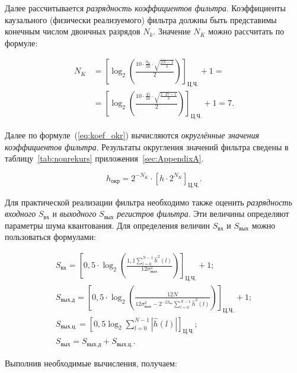 \point Далее рассчитывается \textit{разрядность коэффициентов
  фильтра}. Коэффициенты каузального (физически реализуемого) фильтра
должны быть представимы конечным числом двоичных разрядов $N_k$.
Значение $N_K$ можно рассчитать по формуле:

\begin{align}
  \nonumber N_K & = \left[\log_2\left(\displaystyle
      \frac{\displaystyle 10 \cdot \frac{a_0}{20} \cdot
        \sqrt{\frac{2N-1}{3}}}{2}\right) \right]_{\text{Ц.Ч.}} + 1 =\\
  \nonumber & = \left[\log_2\left(\displaystyle \frac{\displaystyle 10
        \cdot \frac{45}{20} \cdot \sqrt{\frac{2 \cdot
            27-1}{3}}}{2}\right) \right]_{\text{Ц.Ч.}} + 1 = 7.
\end{align}


\point Далее по формуле~(\ref{eq:koef_okr}) вычисляются
\textit{округлённые значения коэффициентов фильтра}. Результаты
округления значений фильтра сведены в таблицу~\ref{tab:nonrekurs}
приложения~\ref{sec:AppendixA}.

\begin{equation}
  \label{eq:koef_okr}
  h_{\text{окр}} = 2^{-N_K} \cdot \left[h \cdot 2^{N_K}\right]_{\text{Ц.Ч.}}.
\end{equation}


\point Для практической реализации фильтра необходимо также оценить
\textit{разрядность входного} $S_{\text{вх}}$ и \textit{выходного}
$S_{\text{вых}}$ \textit{регистров фильтра}. Эти величины определяют
параметры шума квантования. Для определения величин $S_{\text{вх}}$ и
$S_{\text{вых}}$ можно пользоваться формулами:

\begin{gather*}
  S_{\text{вх}} = \left[ 0{,}5 \cdot \log_2\left(\frac{1{,}1 \sum_{l
          =0}^{N-1} \hat h^2(l)}{12 \sigma^2_{\text{вых}}} \right)
  \right]_{\text{Ц.Ч.}}
  + 1;\\
  S_{\text{вых.д}} = \left[0{,}5 \cdot \log_2\left( \frac{12N}{12
        \sigma^2_{\text{вых}} -2^{-2S_{\text{вх}}} \sum_{l=0}^{N-1}
        \hat
        h^2(l)}\right)\right]_{\text{Ц.Ч.}} + 1;\\
  S_{\text{вых.ц.}} = \left[0{,}5 \log_2 \sum_{l=0}^{N-1} \left|\hat
      h(l)\right|\right]_{\text{Ц.Ч.}};\\
  S_{\text{вых}} = S_{\text{вых.д}} + S_{\text{вых.ц.}}.
\end{gather*}

Выполнив необходимые вычисления, получаем:

